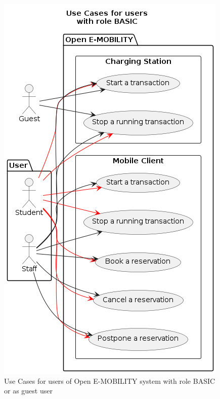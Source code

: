 \begin{figure}[h!]
    \centering
    \includegraphics[scale=0.4]{thesis/sections/images/main/2_chapter/uc_basic_users.png}
    \caption{Use Cases for users of Open E-MOBILITY system with role BASIC or as guest user}
    \label{fig:uc_basic_users}
\end{figure}



